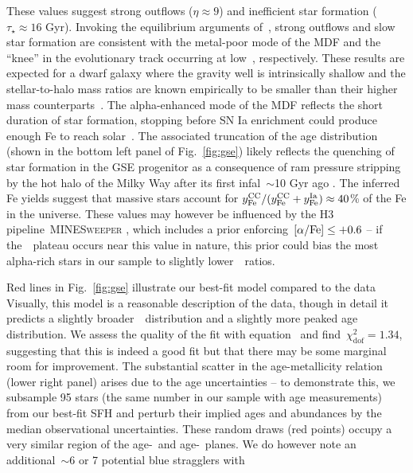 \documentclass[ms.tex]{subfiles}
\begin{document}
These values suggest strong outflows ($\eta \approx 9$) and inefficient star
formation ($\tau_\star \approx 16$ Gyr).
Invoking the equilibrium arguments of~\citet{Weinberg2017}, strong outflows and
slow star formation are consistent with the metal-poor mode of the MDF and the
``knee'' in the evolutionary track occurring at low~\feh, respectively.
These results are expected for a dwarf galaxy where the gravity well is
intrinsically shallow and the stellar-to-halo mass ratios are known empirically
to be smaller than their higher mass counterparts~\citep{Hudson2015}.
The alpha-enhanced mode of the MDF reflects the short duration of star
formation, stopping before SN Ia enrichment could produce enough Fe to reach
solar~\afe.
The associated truncation of the age distribution (shown in the bottom left
panel of Fig.~\ref{fig:gse}) likely reflects the quenching of star
formation in the GSE progenitor as a consequence of ram pressure stripping by
the hot halo of the Milky Way after its first infal~$\sim$10 Gyr ago
\citep{Bonaca2020}.
The inferred Fe yields suggest that massive stars account for
$y_\text{Fe}^\text{CC} / (y_\text{Fe}^\text{CC} + y_\text{Fe}^\text{Ia}) \approx 40$\% of the Fe in the universe.
These values may however be influenced by the H3 pipeline~\textsc{MINESweeper}
\citep{Cargile2020}, which includes a prior enforcing~$\text{[$\alpha$/Fe]} \leq +0.6$ -- if
the~\afe~plateau occurs near this value in nature, this prior could bias the
most alpha-rich stars in our sample to slightly lower~\afe~ratios.
\par
Red lines in Fig.~\ref{fig:gse} illustrate our best-fit model compared to the
data
Visually, this model is a reasonable description of the data, though in detail
it predicts a slightly broader~\feh~distribution and a slightly more peaked age
distribution.
We assess the quality of the fit with equation~ and
find~$\chi_\text{dof}^2 = 1.34$, suggesting that this is indeed a good fit but
that there may be some marginal room for improvement.
The substantial scatter in the age-metallicity relation (lower right panel)
arises due to the age uncertainties -- to demonstrate this, we subsample 95
stars (the same number in our sample with age measurements) from our best-fit
SFH and perturb their implied ages and abundances by the median observational
uncertainties.
These random draws (red points) occupy a very similar region of the age-\feh~and
age-\afe~planes.
We do however note an additional~$\sim$6 or 7 potential blue stragglers with
\end{document}
